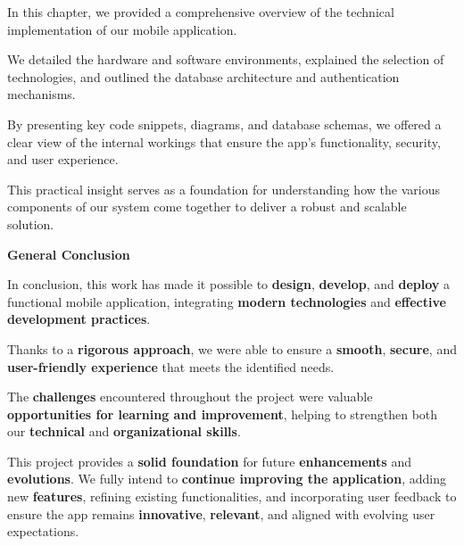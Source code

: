 \documentclass[12pt]{report}
\begin{document}
\noindent In this chapter, we provided a comprehensive overview of the technical implementation of our mobile application.

\vspace{0.3cm}

\noindent We detailed the hardware and software environments, explained the selection of technologies, and outlined the database architecture and authentication mechanisms.

\vspace{0.3cm}

\noindent By presenting key code snippets, diagrams, and database schemas, we offered a clear view of the internal workings that ensure the app’s functionality, security, and user experience.

\vspace{0.3cm}

\noindent This practical insight serves as a foundation for understanding how the various components of our system come together to deliver a robust and scalable solution.


\newpage
\begin{center}
	\Huge \textbf{General Conclusion} \\
	\vspace*{0.3cm}
\end{center}

\noindent In conclusion, this work has made it possible to \textbf{design}, \textbf{develop}, and \textbf{deploy} a functional mobile application, integrating \textbf{modern technologies} and \textbf{effective development practices}.

\vspace{0.3cm}

\noindent Thanks to a \textbf{rigorous approach}, we were able to ensure a \textbf{smooth}, \textbf{secure}, and \textbf{user-friendly experience} that meets the identified needs.

\vspace{0.3cm}

\noindent The \textbf{challenges} encountered throughout the project were valuable \textbf{opportunities for learning and improvement}, helping to strengthen both our \textbf{technical} and \textbf{organizational skills}.

\vspace{0.3cm}

\noindent This project provides a \textbf{solid foundation} for future \textbf{enhancements} and \textbf{evolutions}. We fully intend to \textbf{continue improving the application}, adding new \textbf{features}, refining existing functionalities, and incorporating user feedback to ensure the app remains \textbf{innovative}, \textbf{relevant}, and aligned with evolving user expectations.
\end{document}
